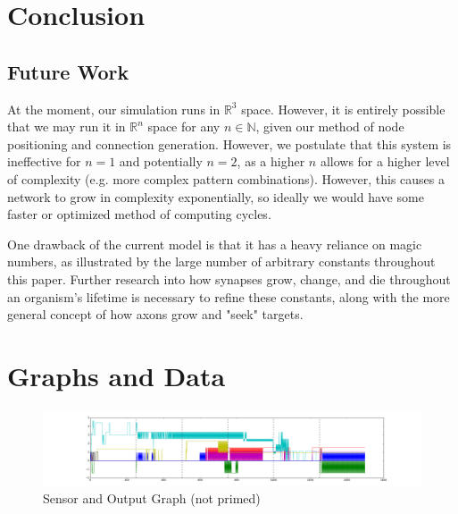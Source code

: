 \documentclass[12pt]{article}
\begin{document}
\newpage

\section{Conclusion}

\subsection{Future Work}

At the moment, our simulation runs in $\mathbb{R}^3$ space.  However, it is entirely possible that we may run it in $\mathbb{R}^n$ space for any $n \in \mathbb{N}$, given our method of node positioning and connection generation.  However, we postulate that this system is ineffective for $n=1$ and potentially $n=2$, as a higher $n$ allows for a higher level of complexity (e.g. more complex pattern combinations).  However, this causes a network to grow in complexity exponentially, so ideally we would have some faster or optimized method of computing cycles.

One drawback of the current model is that it has a heavy reliance on magic numbers, as illustrated by the large number of arbitrary constants throughout this paper.  Further research into how synapses grow, change, and die throughout an organism's lifetime is necessary to refine these constants, along with the more general concept of how axons grow and "seek" targets.

\newpage

\section{Graphs and Data}

\begin{figure}[H]
    \centering
    \includegraphics[width=\textheight,angle=270,keepaspectratio]{../visualizations/8knodes_unrandomized.png}
    \caption{Sensor and Output Graph (not primed)}
\end{figure}
\end{document}
